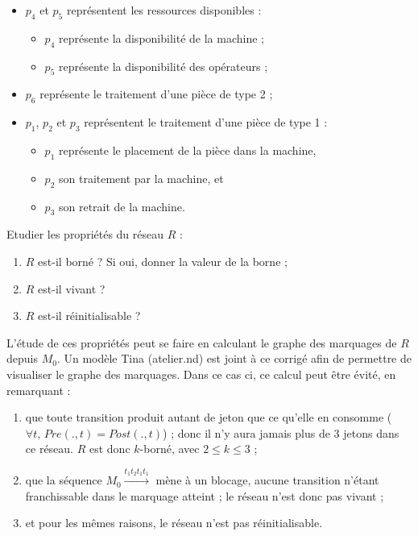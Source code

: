 \documentclass[a4paper]{article}
\begin{document}
\begin{questions}
\begin{correction}{.8}
	\begin{itemize}
	\item $p_4$ et $p_5$ représentent les ressources disponibles :
		\begin{itemize}
		\item $p_4$ représente la disponibilité de la machine ;
		\item $p_5$ représente la disponibilité des opérateurs ;
		\end{itemize}
	\item $p_6$ représente le traitement d'une pièce de type 2 ;
	\item $p_1$, $p_2$ et $p_3$ représentent le traitement d'une pièce de type 1 :
		\begin{itemize}
		\item $p_1$ représente le placement de la pièce dans la machine,
		\item $p_2$ son traitement par la machine, et
		\item $p_3$ son retrait de la machine.
		\end{itemize}
	\end{itemize}
\end{correction}

\question Etudier les propriétés du réseau $R$ :
	\begin{enumerate}
	\item $R$ est-il borné ? Si oui, donner la valeur de la borne ; 
	\item $R$ est-il vivant ? 
	\item $R$ est-il réinitialisable ? 
	\end{enumerate}
	
\begin{correction}{.8}
L'étude de ces propriétés peut se faire en calculant le graphe des marquages de $R$ depuis $M_0$.
Un modèle Tina (atelier.nd) est joint à ce corrigé afin de permettre de visualiser le graphe des marquages.
Dans ce cas ci, ce calcul peut être évité, en remarquant :
	\begin{enumerate}[leftmargin=1cm]
	\item que toute transition produit autant de jeton que ce qu'elle en consomme 
		($\forall t, \, Pre(.,t) = Post(.,t)$) ; donc il n'y aura jamais plus de 3 jetons dans ce réseau.
		$R$ est donc $k$-borné, avec $2 \leq k \leq 3$ ;
	\item que la séquence $M_0 \overset{t_1t_2t_1t_1}{\longrightarrow}$ mène à un blocage,
		aucune transition n'étant franchissable dans le marquage atteint ; le réseau n'est donc pas vivant ;
	\item et pour les mêmes raisons, le réseau n'est pas réinitialisable.
	\end{enumerate}
\end{correction}
	

\end{questions}
\end{document}
